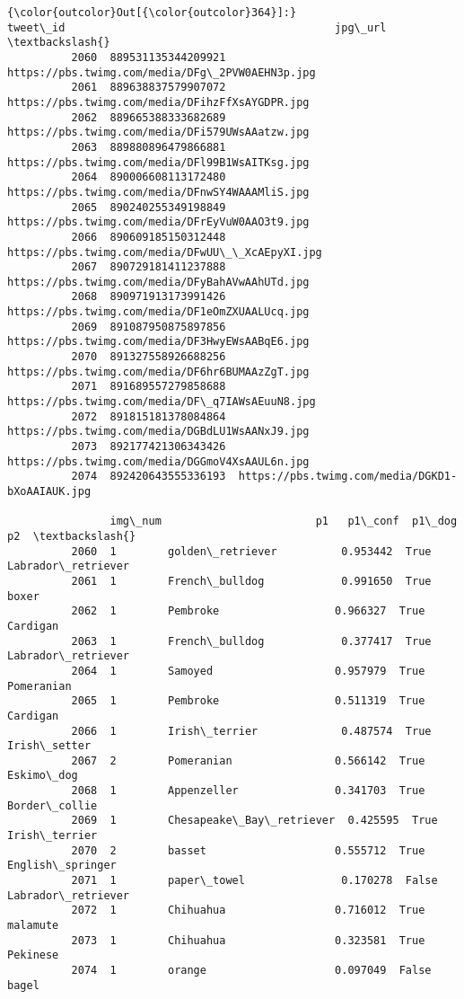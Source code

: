 \documentclass[11pt]{article}
\begin{document}
\begin{Verbatim}[commandchars=\\\{\}]
{\color{outcolor}Out[{\color{outcolor}364}]:}                 tweet\_id                                          jpg\_url  \textbackslash{}
          2060  889531135344209921  https://pbs.twimg.com/media/DFg\_2PVW0AEHN3p.jpg   
          2061  889638837579907072  https://pbs.twimg.com/media/DFihzFfXsAYGDPR.jpg   
          2062  889665388333682689  https://pbs.twimg.com/media/DFi579UWsAAatzw.jpg   
          2063  889880896479866881  https://pbs.twimg.com/media/DFl99B1WsAITKsg.jpg   
          2064  890006608113172480  https://pbs.twimg.com/media/DFnwSY4WAAAMliS.jpg   
          2065  890240255349198849  https://pbs.twimg.com/media/DFrEyVuW0AAO3t9.jpg   
          2066  890609185150312448  https://pbs.twimg.com/media/DFwUU\_\_XcAEpyXI.jpg   
          2067  890729181411237888  https://pbs.twimg.com/media/DFyBahAVwAAhUTd.jpg   
          2068  890971913173991426  https://pbs.twimg.com/media/DF1eOmZXUAALUcq.jpg   
          2069  891087950875897856  https://pbs.twimg.com/media/DF3HwyEWsAABqE6.jpg   
          2070  891327558926688256  https://pbs.twimg.com/media/DF6hr6BUMAAzZgT.jpg   
          2071  891689557279858688  https://pbs.twimg.com/media/DF\_q7IAWsAEuuN8.jpg   
          2072  891815181378084864  https://pbs.twimg.com/media/DGBdLU1WsAANxJ9.jpg   
          2073  892177421306343426  https://pbs.twimg.com/media/DGGmoV4XsAAUL6n.jpg   
          2074  892420643555336193  https://pbs.twimg.com/media/DGKD1-bXoAAIAUK.jpg   
          
                img\_num                        p1   p1\_conf  p1\_dog                  p2  \textbackslash{}
          2060  1        golden\_retriever          0.953442  True    Labrador\_retriever   
          2061  1        French\_bulldog            0.991650  True    boxer                
          2062  1        Pembroke                  0.966327  True    Cardigan             
          2063  1        French\_bulldog            0.377417  True    Labrador\_retriever   
          2064  1        Samoyed                   0.957979  True    Pomeranian           
          2065  1        Pembroke                  0.511319  True    Cardigan             
          2066  1        Irish\_terrier             0.487574  True    Irish\_setter         
          2067  2        Pomeranian                0.566142  True    Eskimo\_dog           
          2068  1        Appenzeller               0.341703  True    Border\_collie        
          2069  1        Chesapeake\_Bay\_retriever  0.425595  True    Irish\_terrier        
          2070  2        basset                    0.555712  True    English\_springer     
          2071  1        paper\_towel               0.170278  False   Labrador\_retriever   
          2072  1        Chihuahua                 0.716012  True    malamute             
          2073  1        Chihuahua                 0.323581  True    Pekinese             
          2074  1        orange                    0.097049  False   bagel                
          

\end{Verbatim}
\end{document}
